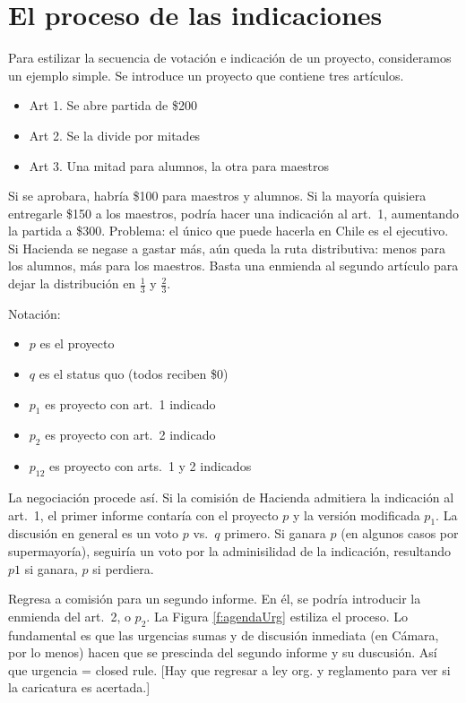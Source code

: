 \documentclass[letter,12pt]{article}
\begin{document}
\section{El proceso de las indicaciones}

Para estilizar la secuencia de votación e indicación de un proyecto, consideramos un ejemplo simple. Se introduce un proyecto que contiene tres artículos. 

\begin{itemize}
\item Art 1. Se abre partida de \$200
\item Art 2. Se la divide por mitades
\item Art 3. Una mitad para alumnos, la otra para maestros
\end{itemize}

\noindent Si se aprobara, habría \$100 para maestros y alumnos. Si la mayoría quisiera entregarle \$150 a los maestros, podría hacer una indicación al art.\ 1, aumentando la partida a \$300. Problema: el único que puede hacerla en Chile es el ejecutivo. Si Hacienda se negase a gastar más, aún queda la ruta distributiva: menos para los alumnos, más para los maestros. Basta una enmienda al segundo artículo para dejar la distribución en $\frac{1}{3}$ y $\frac{2}{3}$. 

Notación:
\begin{itemize}
\item $p$ es el proyecto
\item $q$ es el status quo (todos reciben \$0)
\item $p_1$ es proyecto con art.\ 1 indicado
\item $p_2$ es proyecto con art.\ 2 indicado
\item $p_{12}$ es proyecto con arts.\ 1 y 2 indicados
\end{itemize}

La negociación procede así. Si la comisión de Hacienda admitiera la indicación al art.\ 1, el primer informe contaría con el proyecto $p$ y la versión modificada $p_1$. La discusión en general es un voto $p$ vs.\ $q$ primero. Si ganara $p$ (en algunos casos por supermayoría), seguiría un voto por la adminisilidad de la indicación, resultando $p1$ si ganara, $p$ si perdiera.

Regresa a comisión para un segundo informe. En él, se podría introducir la enmienda del art.\ 2, o $p_2$. La Figura \ref{f:agendaUrg} estiliza el proceso. Lo fundamental es que las urgencias sumas y de discusión inmediata (en Cámara, por lo menos) hacen que se prescinda del segundo informe y su duscusión. Así que urgencia = closed rule. [Hay que regresar a ley org. y reglamento para ver si la caricatura es acertada.]
\end{document}
